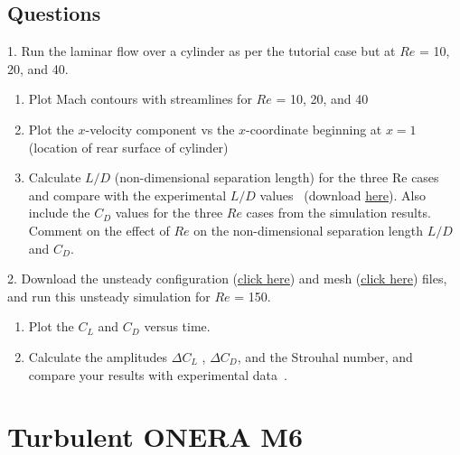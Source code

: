 \section{Questions}
1. Run the laminar flow over a cylinder as per the tutorial case but at $Re$ = 10, 20, and 40.
\begin{enumerate}[label=(\alph*)]
    \item Plot Mach contours with streamlines for $Re$ = 10, 20, and 40
    \item Plot the $x$-velocity component vs the $x$-coordinate beginning at $x = 1$ (location of rear surface of cylinder)
    \item Calculate $L/D$ (non-dimensional separation length) for the three Re cases and compare with the experimental $L/D$ values~\cite{coutanceau1977experimental} (download \href{https://gitlab.com/bvermeir/book-cfd/blob/master/tutorial/tut4_laminar_cylinder/experimental_values.zip}{\underline{here}}). Also include the $C_D$ values for the three $Re$ cases from the simulation results. Comment on the effect of $Re$ on the non-dimensional separation length $L/D$ and $C_D$.
\end{enumerate}
2. Download the unsteady configuration (\href{https://gitlab.com/bvermeir/book-cfd/blob/master/tutorial/tut4_laminar_cylinder/unsteady/lam_cylinder_re150_unsteady.cfg}{\underline{click here}}) and mesh (\href{https://gitlab.com/bvermeir/book-cfd/blob/master/tutorial/tut4_laminar_cylinder/unsteady/mesh_cylinder_lam.su2}{\underline{click here}}) files, and run this unsteady simulation for $Re$ = 150.
\begin{enumerate}[label=(\alph*)]
    \item Plot the $C_L$ and $C_D$ versus time.
    \item Calculate the amplitudes $\Delta C_L$ , $\Delta C_D$, and the Strouhal number, and compare your results with experimental data~\cite{inoue2002sound}.
\end{enumerate}
\chapter{Turbulent ONERA M6}
\label{ch:Turbulent ONERA M6}
